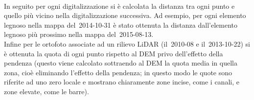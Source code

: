 %
\\
In seguito per ogni digitalizzazione si è calcolata la distanza tra ogni punto e quello più vicino nella digitalizzazione successiva. Ad esempio, per ogni elemento legnoso nella mappa del~2014-10-31 è stato ottenuta la distanza dall'elemento legnoso più prossimo nella mappa del~2015-08-13.
\\
Infine per le ortofoto associate ad un rilievo LiDAR (il~2010-08 e il~2013-10-22) si è ottenuta la quota di ogni punto rispetto al DEM privo dell'effetto della pendenza (questo viene calcolato sottraendo al DEM la quota media in quella zona, cioè eliminando l'effetto della pendenza; in questo modo le quote sono riferite ad uno zero locale e mostrano chiaramente zone incise, come i canali, e zone elevate, come le barre).

